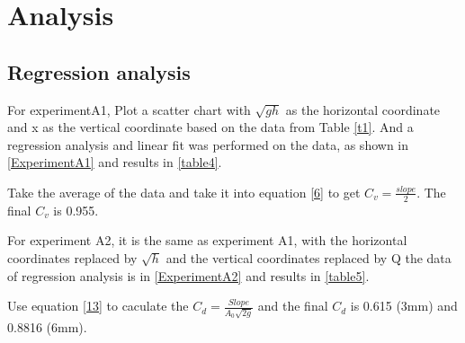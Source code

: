 \section{Analysis}
\label{sec:analysis}
\subsection{Regression analysis}
For experimentA1,
Plot a scatter chart with $\sqrt{gh}$ as the horizontal coordinate 
and x as the vertical coordinate based on the data from Table \ref{t1}.
And a regression analysis and linear fit was performed on the data, 
as shown in \autoref{ExperimentA1} and results in \autoref{table4}.

Take the average of 
the data and take it into equation \eqref{6} to get $C_v=\frac{slope}{2}$.
The final $C_v$ is 0.955.

For experiment A2, it is the same as experiment A1, with the horizontal 
coordinates replaced by $\sqrt{h}$ and the vertical coordinates replaced by Q
the data of regression analysis is in \autoref{ExperimentA2}
and results in \autoref{table5}.

Use equation \eqref{13} to caculate the $C_d=\frac{Slope}{A_0\sqrt{2g}}$
and the final $C_d$ is 0.615 (3mm)
and 0.8816 (6mm).

